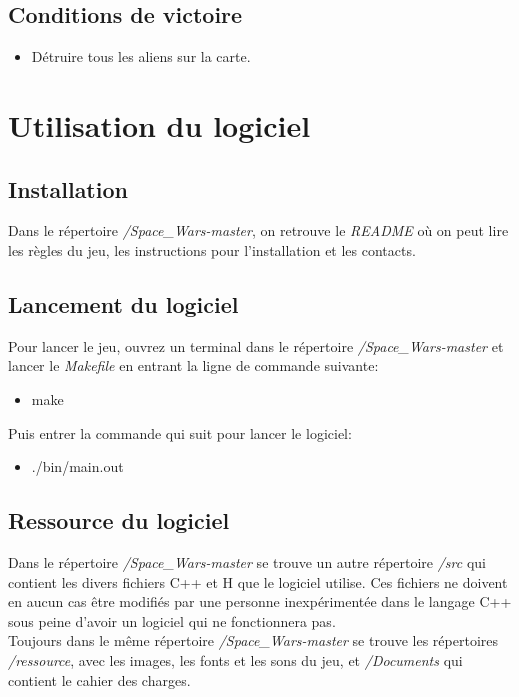 \documentclass[french, 11pt]{report}
\begin{document}
		\subsection{Conditions de victoire}\label{conditionsDeVictoire}
		\begin{itemize}
			\item Détruire tous les aliens sur la carte.
		\end{itemize}
	
	\section{Utilisation du logiciel}
	
	\subsection{Installation}
	Dans le répertoire \textit{/Space\_Wars-master}, on retrouve le \textit{README} où on peut lire les règles du jeu, les instructions pour l'installation et les contacts.
	
	\subsection{Lancement du logiciel}
	Pour lancer le jeu, ouvrez un terminal dans le répertoire \textit{/Space\_Wars-master} et lancer le \textit{Makefile} en entrant la ligne de commande suivante:
	\begin{itemize}
		\item make
	\end{itemize}
	Puis entrer la commande qui suit pour lancer le logiciel:
	\begin{itemize}
		\item ./bin/main.out
	\end{itemize}
	
	\subsection{Ressource du logiciel}
	Dans le répertoire \textit{/Space\_Wars-master} se trouve un autre répertoire \textit{/src} qui contient les divers fichiers C++ et H que le logiciel utilise. Ces fichiers ne doivent en aucun cas être modifiés par une personne inexpérimentée dans le langage C++ sous peine d'avoir un logiciel qui ne fonctionnera pas. \\
	Toujours dans le même répertoire \textit{/Space\_Wars-master} se trouve les répertoires \textit{/ressource}, avec les images, les fonts et les sons du jeu, et \textit{/Documents} qui contient le cahier des charges.
	
\end{document}
